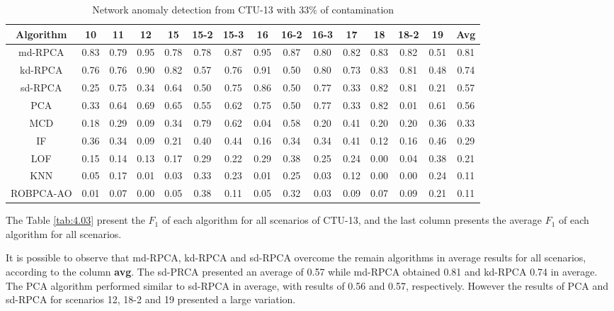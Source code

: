 \begin{table}[h!]
  \centering
  \scriptsize
  \caption{Network anomaly detection from CTU-13 with 33\% of contamination}
  \label{tab:4.05}
  \begin{tabular}{ c|c|c|c|c|c|c|c|c|c|c|c|c|c|c }
	\toprule
        \textbf{Algorithm}	&\textbf{10}	&\textbf{11}	&\textbf{12}	&\textbf{15}	&\textbf{15-2}	&\textbf{15-3}	&\textbf{16}	&\textbf{16-2}	&\textbf{16-3}	&\textbf{17}	&\textbf{18}	&\textbf{18-2}	&\textbf{19}	&\textbf{Avg} \\ \hline
        md-RPCA     &0.83  &0.79  &0.95  &0.78  &0.78  &0.87  &0.95  &0.87  &0.80  &0.82  &0.83  &0.82  &0.51  &0.81  \\ \hline
        kd-RPCA     &0.76  &0.76  &0.90  &0.82  &0.57  &0.76  &0.91  &0.50  &0.80  &0.73  &0.83  &0.81  &0.48  &0.74  \\ \hline
        sd-RPCA     &0.25  &0.75  &0.34  &0.64  &0.50  &0.75  &0.86  &0.50  &0.77  &0.33  &0.82  &0.81  &0.21  &0.57  \\ \hline
        PCA   &0.33  &0.64  &0.69  &0.65  &0.55  &0.62  &0.75  &0.50  &0.77  &0.33  &0.82  &0.01  &0.61  &0.56  \\ \hline
        MCD   &0.18  &0.29  &0.09  &0.34  &0.79  &0.62  &0.04  &0.58  &0.20  &0.41  &0.20  &0.20  &0.36  &0.33  \\ \hline
        IF    &0.36  &0.34  &0.09  &0.21  &0.40  &0.44  &0.16  &0.34  &0.34  &0.41  &0.12  &0.16  &0.46  &0.29  \\ \hline
        LOF   &0.15  &0.14  &0.13  &0.17  &0.29  &0.22  &0.29  &0.38  &0.25  &0.24  &0.00  &0.04  &0.38  &0.21  \\ \hline
        KNN   &0.05  &0.17  &0.01  &0.03  &0.33  &0.23  &0.01  &0.25  &0.03  &0.12  &0.00  &0.00  &0.24  &0.11  \\ \hline
        ROBPCA-AO   &0.01  &0.07  &0.00  &0.05  &0.38  &0.11  &0.05  &0.32  &0.03  &0.09  &0.07  &0.09  &0.21  &0.11  \\ \hline
    \bottomrule
  \end{tabular}
\end{table}

The Table \ref{tab:4.03} present the $F_1$ of each algorithm for all scenarios of CTU-13, and the last column presents the average $F_1$ of each algorithm for all scenarios.

It is possible to observe that md-RPCA, kd-RPCA and sd-RPCA overcome the remain algorithms in average results for all scenarios, according to the column \textbf{avg}. The sd-PRCA presented an average of 0.57 while md-RPCA obtained 0.81 and kd-RPCA 0.74 in average. The PCA algorithm performed similar to sd-RPCA in average, with results of 0.56 and 0.57, respectively. However the results of PCA and sd-RPCA for scenarios 12, 18-2 and 19 presented a large variation.

